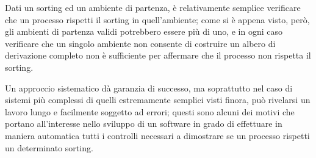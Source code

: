 Dati un sorting ed un ambiente di partenza, \`e relativamente semplice
verificare che un processo rispetti il sorting in quell'ambiente; come
si \`e appena visto, per\`o, gli ambienti di partenza validi potrebbero
essere pi\`u di uno, e in ogni caso verificare che un singolo ambiente
non consente di costruire un albero di derivazione completo non \`e
sufficiente per affermare che il processo non rispetta il sorting.

Un approccio sistematico d\`a garanzia di successo, ma soprattutto nel
caso di sistemi pi\`u complessi di quelli estremamente semplici visti
finora, pu\`o rivelarsi un lavoro lungo e facilmente soggetto ad
errori; questi sono alcuni dei motivi che portano all'interesse nello
sviluppo di un software in grado di effettuare in maniera automatica
tutti i controlli necessari a dimostrare se un processo rispetti un
determinato sorting.
